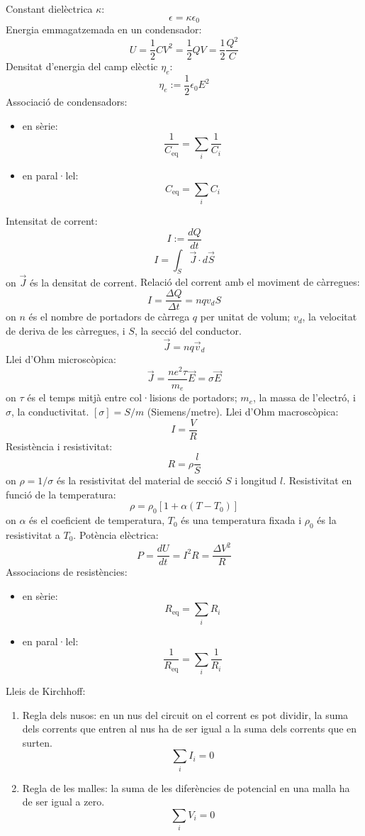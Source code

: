 \documentclass[../../../main.tex]{subfiles}
\begin{document}
\begin{multicols}{2}
Constant dielèctrica $\kappa$: $$\epsilon=\kappa\epsilon_0$$
Energia emmagatzemada en un condensador: $$U=\frac{1}{2}CV^2=\frac{1}{2}QV=\frac{1}{2}\frac{Q^2}{C}$$
Densitat d'energia del camp elèctic $\eta_e$: $$\eta_e:=\frac{1}{2}\epsilon_0E^2$$
Associació de condensadors:
\begin{itemize}
    \item en sèrie:$$\frac{1}{C_{\text{eq}}}=\sum_i\frac{1}{C_i}$$
    \item en paral·lel: $$C_{\text{eq}}=\sum_iC_i$$ 
\end{itemize}
Intensitat de corrent: $$I:=\frac{dQ}{dt}$$
$$I=\int_S \Vec{J}\cdot d\Vec{S}$$ {on $\Vec{J}$ és la densitat de corrent.}\newline
Relació del corrent amb el moviment de càrregues:
$$I=\frac{\Delta Q}{\Delta t}=nqv_dS$$ {on $n$ és el nombre de portadors de càrrega $q$ per unitat de volum; $v_d$, la velocitat de deriva de les càrregues, i $S$, la secció del conductor.}
$$\Vec{J}=nq\Vec{v}_d$$
Llei d'Ohm microscòpica: $$\Vec{J}=\frac{ne^2\tau}{m_e}\Vec{E}=\sigma\Vec{E}$$ {on $\tau$ és el temps mitjà entre col·lisions de portadors; $m_e$, la massa de l'electró, i $\sigma$, la conductivitat. $[\sigma]=S/m$ (Siemens$/$metre).}\newline
Llei d'Ohm macroscòpica: $$I=\frac{V}{R}$$
Resistència i resistivitat: $$R=\rho\frac{l}{S}$$ {on $\rho=1/\sigma$ és la resistivitat del material de secció $S$ i longitud $l$.}\newline
Resistivitat en funció de la temperatura: $$\rho=\rho_0[1+\alpha(T-T_0)]$$ {on $\alpha$ és el coeficient de temperatura, $T_0$ és una temperatura fixada i $\rho_0$ és la resistivitat a $T_0$.}\newline
Potència elèctrica: $$P=\frac{dU}{dt}=I^2R=\frac{\Delta V^2}{R}$$
Associacions de resistències: 
\begin{itemize}
    \item en sèrie:$$R_{\text{eq}}=\sum_iR_i$$
    \item en paral·lel: $$\frac{1}{R_{\text{eq}}}=\sum_i\frac{1}{R_i}$$
\end{itemize}
Lleis de Kirchhoff:
\begin{enumerate}
    \item Regla dels nusos: en un nus del circuit on el corrent es pot dividir, la suma dels corrents que entren al nus ha de ser igual a la suma dels corrents que en surten. $$\sum_iI_i=0$$
    \item Regla de les malles: la suma de les diferències de potencial en una malla ha de ser igual a zero. $$\sum_iV_i=0$$

\end{enumerate}
\end{multicols}
\end{document}
